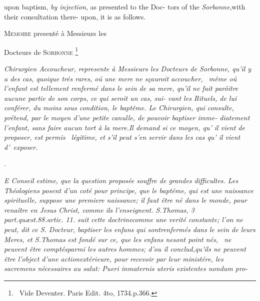 \documentclass{article}
\begin{document}
\medskip


\medskip

\bgroup\fontsize{8}{11}\selectfont
{}\break 
upon baptism, \textit{by injection}, as presented to the Doc-\break
tors of the \textit{Sorbonne},\tsk with their consultation there-\break
upon, it is as follows.\par\egroup

\newpage\null\smallskip
\centerline{\textsc{Memoire} presenté à Messieurs les}
\centerline{Docteurs de \textsc{Sorbonne} \footnote{\ Vide Deventer. Paris Edit. 4to,
1734.\@ p.\@ 366.}}

\bgroup\itshape\setlength{\baselineskip}{13pt}
Chirurgien Accoucheur, represente à\break 
Messieurs les Docteurs de \textnormal{Sorbonne},\break 
qu’il y a des cas, quoique trés rares, oú une\break
mere ne sçauroit accoucher, \et\ même oú\break
l’enfant est tellement renfermé dans le sein\break
de sa mere, qu’il ne fait parôitre aucune\break
partie de son corps, ce qui seroit un cas, sui-\break
vant les Rituels, de lui conférer, du moins\break
sous condition, le baptême. Le Chirurgien,\break
qui consulte, prétend, par le moyen d’une\break
\textnormal{petite canulle,} de pouvoir baptiser imme-\break
diatement l’enfant, sans faire aucun tort à\break
la mere.\tsh Il demand si ce moyen, qu’ il\break
vient de proposer, est permis \et\ légitime, et\break
s’il peut s’en servir dans les cas qu’ il vient\break
d’~exposer.\egroup

\bigskip{}
\newpage\null\smallskip
\centerline{.}

\bgroup\fontsize{9.6}{13}\selectfont\itshape
E Conseil estime, que la question proposée 
souffre de grandes difficultes. Les Théo\-logiens 
posent d’un coté pour principe, que\break
le baptéme, qui est une naissance spirituelle,\break
suppose une premiere naissance; il faut être né\break
dans le monde, pour renaître en \textnormal{Jesus Christ},\break
comme ils l’enseignent. S.\@ \textnormal{Thomas, 3 part.\break quæst.\@ 88.\@ artic.\@
11.\@} suit cette doctrine\break comme une verité constante\textnormal{;} l’on ne peut, dit ce S.
Docteur, baptiser les enfans qui sont\break renfermés dans le sein de leurs Meres,
et S.\break \textnormal{Thomas} est fondé sur ce, que les enfans ne\break sont
point nés, \et\ ne peuvent être comptés\break parmi les autres hommes; d’ou il
conclud,\break qu’ils ne peuvent être l’object d’une action\break extérieure, pour
recevoir par leur ministére, les sacremens nécessaires au salut: 
\textnormal{Pueri in\break maternis uteris existentes nondum pro-}\break
{}
\egroup
\end{document}
